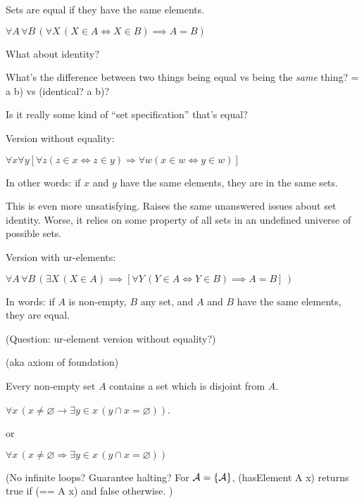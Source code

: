
Sets are equal if they have the same 
elements.\cite{wiki:Axiom_of_extensionality,wiki:Extensionality}

$\forall A\,\forall B\,
(\forall X\,(X\in A\iff X\in B)
\implies A=B)$

What about identity? 

What's the difference between two things being equal vs
being the \textit{same} thing? 
\textsf{= a b)} vs \textsf{(identical? a b)}?

Is it really some kind of ``set specification'' that's equal?

Version without equality:

$\forall x
\forall y
[\forall z(z\in x\Leftrightarrow z\in y)
\Rightarrow 
\forall w(x\in w\Leftrightarrow y\in w)]$

In other words: if $x$ and $y$ have the same elements, 
they are in the same sets.

This is even more unsatisfying. 
Raises the same unanswered issues about set identity.
Worse, it relies on some property of all sets in an undefined 
universe of possible sets.

Version with ur-elements:

$\forall A\,\forall B\,(\exists X\,(X\in A)\implies
 [\forall Y\,(Y\in A\iff Y\in B)\implies A=B]\,)$
 
In words: 
if $A$ is non-empty, $B$ any set, and $A$ and $B$ have the same
elements, they are equal.

(Question: ur-element version without equality?)


(aka axiom of foundation)~\cite{wiki:Axiom_of_regularity}

Every non-empty set $A$ contains a set which is disjoint from $A$.

$\forall x\,(x\neq \varnothing
\rightarrow 
\exists y\in x\,(y\cap x=\varnothing ))$.
 
or
 
$\forall x\,(x\neq \varnothing \Rightarrow 
 \exists y\in x\,(y\cap x=\varnothing ))$
 
(No infinite loops? Guarantee halting? 
For $\mathcal{A} = \{\mathcal{A}\}$,
\textsf{(hasElement A x)} 
returns \textsf{true} if \textsf{(== A x)}
and \textsf{false} otherwise. )

